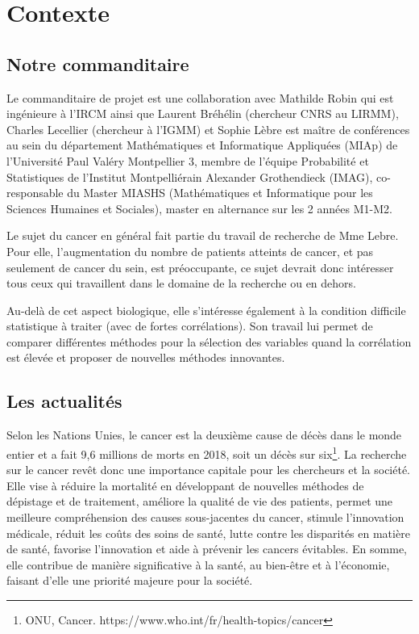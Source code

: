 \documentclass[mstat,12pt]{unswthesis}
\begin{document}


\hypertarget{contexte}{%
\chapter{Contexte}\label{contexte}}

\hypertarget{notre-commanditaire}{%
\section{Notre commanditaire}\label{notre-commanditaire}}

Le commanditaire de projet est une collaboration avec Mathilde Robin qui
est ingénieure à l'IRCM ainsi que Laurent Bréhélin (chercheur CNRS au
LIRMM), Charles Lecellier (chercheur à l'IGMM) et Sophie Lèbre est
maître de conférences au sein du département Mathématiques et
Informatique Appliquées (MIAp) de l'Université Paul Valéry Montpellier
3, membre de l'équipe Probabilité et Statistiques de l'Institut
Montpelliérain Alexander Grothendieck (IMAG), co-responsable du Master
MIASHS (Mathématiques et Informatique pour les Sciences Humaines et
Sociales), master en alternance sur les 2 années M1-M2.

\bigskip

Le sujet du cancer en général fait partie du travail de recherche de Mme
Lebre. Pour elle, l'augmentation du nombre de patients atteints de
cancer, et pas seulement de cancer du sein, est préoccupante, ce sujet
devrait donc intéresser tous ceux qui travaillent dans le domaine de la
recherche ou en dehors.

\bigskip

Au-delà de cet aspect biologique, elle s'intéresse également à la
condition difficile statistique à traiter (avec de fortes corrélations).
Son travail lui permet de comparer différentes méthodes pour la
sélection des variables quand la corrélation est élevée et proposer de
nouvelles méthodes innovantes.

\hypertarget{les-actualituxe9s}{%
\section{Les actualités}\label{les-actualituxe9s}}

Selon les Nations Unies, le cancer est la deuxième cause de décès dans
le monde entier et a fait 9,6 millions de morts en 2018, soit un décès
sur
six\footnote{ ONU, Cancer. https://www.who.int/fr/health-topics/cancer}.
La recherche sur le cancer revêt donc une importance capitale pour les
chercheurs et la société. Elle vise à réduire la mortalité en
développant de nouvelles méthodes de dépistage et de traitement,
améliore la qualité de vie des patients, permet une meilleure
compréhension des causes sous-jacentes du cancer, stimule l'innovation
médicale, réduit les coûts des soins de santé, lutte contre les
disparités en matière de santé, favorise l'innovation et aide à prévenir
les cancers évitables. En somme, elle contribue de manière significative
à la santé, au bien-être et à l'économie, faisant d'elle une priorité
majeure pour la société.
\end{document}
